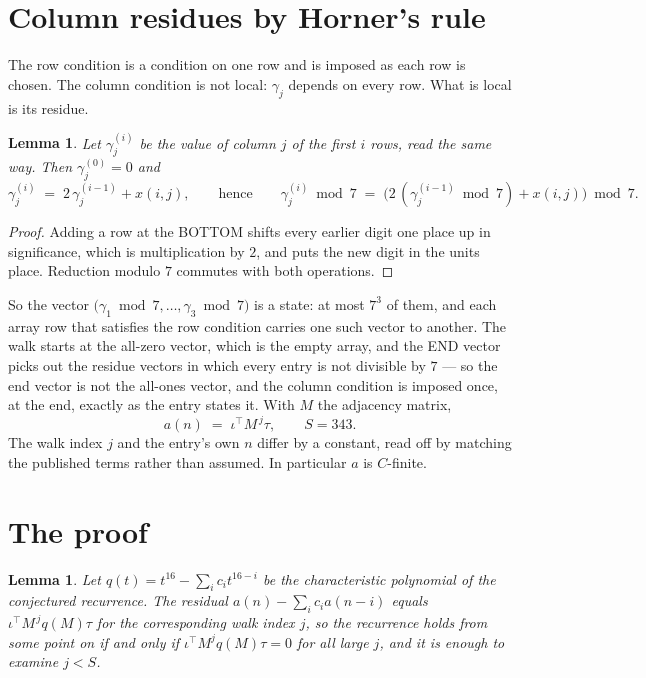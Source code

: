 \documentclass[11pt,a4paper]{article}
\theoremstyle{plain}
\newtheorem{lemma}[theorem]{Lemma}
\theoremstyle{definition}
\begin{document}
\section{Column residues by Horner's rule}

The row condition is a condition on one row and is imposed as each row is chosen. The column
condition is not local: $\gamma_j$ depends on every row. What is local is its residue.

\begin{lemma}\label{lem:horner}
Let $\gamma_j^{(i)}$ be the value of column $j$ of the first $i$ rows, read the same way.
Then $\gamma_j^{(0)}=0$ and
\[
\gamma_j^{(i)}\;=\;2\,\gamma_j^{(i-1)}+x(i,j),
\qquad\text{hence}\qquad
\gamma_j^{(i)}\bmod 7\;=\;
\bigl(2\,(\gamma_j^{(i-1)}\bmod 7)+x(i,j)\bigr)\bmod 7 .
\]
\end{lemma}

\begin{proof}
Adding a row at the BOTTOM shifts every earlier digit one place up in significance, which is
multiplication by $2$, and puts the new digit in the units place. Reduction modulo
$7$ commutes with both operations.
\end{proof}

So the vector $\bigl(\gamma_1\bmod 7,\dots,\gamma_{3}\bmod
7\bigr)$ is a state: at most $7^{3}$ of them, and each array row
that satisfies the row condition carries one such vector to another. The walk starts at the
all-zero vector, which is the empty array, and the END vector picks out the residue vectors in
which every entry is not divisible by $7$ --- so the end vector is not the all-ones
vector, and the column condition is imposed once, at the end, exactly as the entry states it.
With $M$ the adjacency matrix,
\[
a(n)\;=\;\iota^{\!\top}M^{\,j}\tau ,\qquad S=343.
\]
The walk index $j$ and the entry's own $n$ differ by a constant, read off by matching the
published terms rather than assumed. In particular $a$ is $C$-finite.

\section{The proof}

\begin{lemma}\label{lem:crit}
Let $q(t)=t^{16}-\sum_i c_it^{16-i}$ be the characteristic polynomial of the
conjectured recurrence. The residual $a(n)-\sum_ic_ia(n-i)$ equals
$\iota^{\!\top}M^{\,j}q(M)\tau$ for the corresponding walk index $j$, so the recurrence
holds from some point on if and only if $\iota^{\!\top}M^{j}q(M)\tau=0$ for all large $j$,
and it is enough to examine $j<S$.
\end{lemma}
\end{document}

